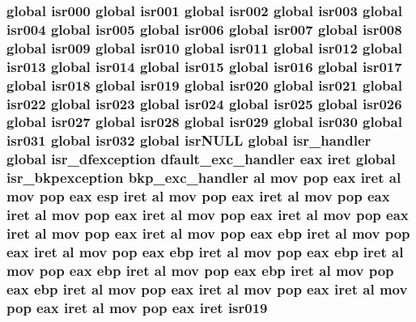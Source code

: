 \subsubsection[{\texorpdfstring{isr019}{isr019}}]{\setlength{\rightskip}{0pt plus 5cm}global {\bf isr000} global {\bf isr001} global {\bf isr002} global {\bf isr003} global {\bf isr004} global {\bf isr005} global {\bf isr006} global {\bf isr007} global {\bf isr008} global {\bf isr009} global {\bf isr010} global {\bf isr011} global {\bf isr012} global {\bf isr013} global {\bf isr014} global {\bf isr015} global {\bf isr016} global {\bf isr017} global {\bf isr018} global isr019 global {\bf isr020} global {\bf isr021} global {\bf isr022} global {\bf isr023} global {\bf isr024} global {\bf isr025} global {\bf isr026} global {\bf isr027} global {\bf isr028} global {\bf isr029} global {\bf isr030} global {\bf isr031} global isr032 global isr\+N\+U\+LL global isr\+\_\+handler global {\bf isr\+\_\+dfexception} {\bf dfault\+\_\+exc\+\_\+handler} eax iret global {\bf isr\+\_\+bkpexception} {\bf bkp\+\_\+exc\+\_\+handler} {\bf al} {\bf mov} pop eax iret {\bf al} {\bf mov} pop eax esp iret {\bf al} {\bf mov} pop eax iret {\bf al} {\bf mov} pop eax iret {\bf al} {\bf mov} pop eax iret {\bf al} {\bf mov} pop eax iret {\bf al} {\bf mov} pop eax iret {\bf al} {\bf mov} pop eax iret {\bf al} {\bf mov} pop eax ebp iret {\bf al} {\bf mov} pop eax iret {\bf al} {\bf mov} pop eax ebp iret {\bf al} {\bf mov} pop eax ebp iret {\bf al} {\bf mov} pop eax ebp iret {\bf al} {\bf mov} pop eax ebp iret {\bf al} {\bf mov} pop eax ebp iret {\bf al} {\bf mov} pop eax iret {\bf al} {\bf mov} pop eax iret {\bf al} {\bf mov} pop eax iret {\bf al} {\bf mov} pop eax iret isr019}\hypertarget{isrs_8as_a24cd9fc6973ca7223030924bcccd08c8}{}\label{isrs_8as_a24cd9fc6973ca7223030924bcccd08c8}
